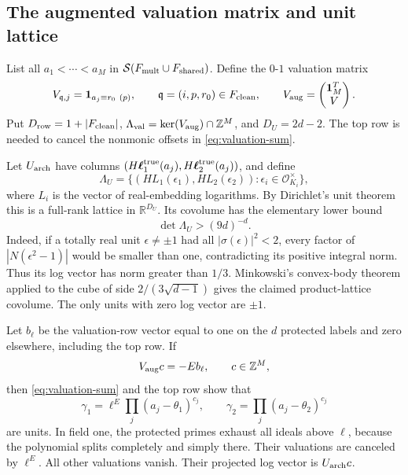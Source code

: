 \subsection{The augmented valuation matrix and unit lattice}

List all \(a_1<\cdots<a_M\) in
\(\mathcal S(F_{\rm mult}\cup F_{\rm shared})\).  Define the
\(0\)-\(1\) valuation matrix
\[
 V_{\mathfrak q,j}=\mathbf1_{a_j\equiv r_0\ (p)},
 \qquad \mathfrak q=(i,p,r_0)\in F_{\rm clean},
 \qquad
 V_{\rm aug}=\begin{pmatrix}\mathbf1_M^T\\V\end{pmatrix}.
\]
Put \(D_{\rm row}=1+|F_{\rm clean}|\),
\(\Lambda_{\rm val}=\ker(V_{\rm aug})\cap\mathbb Z^M\), and
\(D_U=2d-2\).  The top row is needed to cancel the nonmonic offsets
in \eqref{eq:valuation-sum}.

Let \(U_{\rm arch}\) have columns
\((H\boldsymbol\ell_1^{\rm true}(a_j),
H\boldsymbol\ell_2^{\rm true}(a_j))\), and define
\[
 \Lambda_U=
 \{(HL_1(\epsilon_1),HL_2(\epsilon_2)):
                      \epsilon_i\in\mathcal O_{K_i}^{\times}\},
\]
where \(L_i\) is the vector of real-embedding logarithms.  By
Dirichlet's unit theorem this is a full-rank lattice in
\(\mathbb R^{D_U}\).  Its covolume has the elementary lower bound
\begin{equation}\label{eq:unit-covolume}
 \det\Lambda_U>(9d)^{-d}.
\end{equation}
Indeed, if a totally real unit \(\epsilon\ne\pm1\) had all
\(|\sigma(\epsilon)|^2<2\), every factor of
\(|N(\epsilon^2-1)|\) would be smaller than one, contradicting
its positive integral norm.  Thus its log vector has norm greater
than \(1/3\).  Minkowski's convex-body theorem applied to the cube
of side \(2/(3\sqrt{d-1})\) gives the claimed product-lattice
covolume.  The only units with zero log vector are \(\pm1\).

Let \(b_\ell\) be the valuation-row vector equal to one on the
\(d\) protected labels and zero elsewhere, including the top row.
If
\[
 V_{\rm aug}c=-E b_\ell,\qquad c\in\mathbb Z^M,
\]
then \eqref{eq:valuation-sum} and the top row show that
\[
 \gamma_1=\ell^E\prod_j(a_j-\theta_1)^{c_j},\qquad
 \gamma_2=\prod_j(a_j-\theta_2)^{c_j}
\]
are units.  In field one, the protected primes exhaust all ideals
above \(\ell\), because the polynomial splits completely and
simply there.  Their valuations are canceled by \(\ell^E\).
All other valuations vanish.  Their projected log vector is
\(U_{\rm arch}c\).

